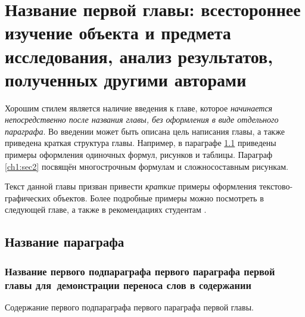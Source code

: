 \chapter{Название первой главы: всестороннее изучение объекта и предмета исследования, анализ результатов, полученных другими авторами} \label{ch1}


Хорошим стилем является наличие введения к главе, которое \textit{начинается непосредственно после названия главы, без оформления в виде отдельного параграфа}. Во введении может быть описана цель написания главы, а также приведена краткая структура главы. Например, в параграфе \ref{ch1:sec1} приведены примеры оформления одиночных формул, рисунков и таблицы. Параграф \ref{ch1:sec2} посвящён многострочным формулам и сложносоставным рисункам.

Текст данной главы призван привести \textit{краткие} примеры оформления текстово-графических объектов. Более подробные примеры можно посмотреть в следующей главе, а также в рекомендациях студентам \cite{spbpu-student-thesis-template-author-guide}. 


\section{Название параграфа} \label{ch1:sec1}


\subsection{Название первого подпараграфа первого параграфа первой главы для~демонстрации переноса слов в содержании} %

Содержание первого подпараграфа первого параграфа первой главы.



